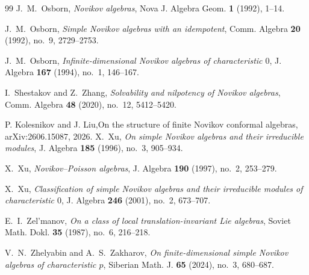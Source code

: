 \documentclass[11pt,reqno]{amsart}
\theoremstyle{plain}
\theoremstyle{definition}
\begin{document}
\begin{thebibliography}{99}
J.~M.~Osborn,
\emph{Novikov algebras},
Nova J. Algebra Geom. \textbf{1} (1992), 1--14.

J.~M.~Osborn,
\emph{Simple Novikov algebras with an idempotent},
Comm. Algebra \textbf{20} (1992), no.~9, 2729--2753.

J.~M.~Osborn,
\emph{Infinite-dimensional Novikov algebras of characteristic $0$},
J. Algebra \textbf{167} (1994), no.~1, 146--167.

I.~Shestakov and Z.~Zhang,
\emph{Solvability and nilpotency of Novikov algebras},
Comm. Algebra \textbf{48} (2020), no.~12, 5412--5420.

P. Kolesnikov and  J. Liu,On the structure of finite Novikov conformal algebras, 	arXiv:2606.15087, 2026.
X.~Xu,
\emph{On simple Novikov algebras and their irreducible modules},
J. Algebra \textbf{185} (1996), no.~3, 905--934.

X.~Xu,
\emph{Novikov--Poisson algebras},
J. Algebra \textbf{190} (1997), no.~2, 253--279.

X.~Xu,
\emph{Classification of simple Novikov algebras and their irreducible modules of
characteristic $0$},
J. Algebra \textbf{246} (2001), no.~2, 673--707.

E.~I.~Zel'manov,
\emph{On a class of local translation-invariant Lie algebras},
Soviet Math. Dokl. \textbf{35} (1987), no.~6, 216--218.

V.~N.~Zhelyabin and A.~S.~Zakharov,
\emph{On finite-dimensional simple Novikov algebras of characteristic $p$},
Siberian Math. J. \textbf{65} (2024), no.~3, 680--687.

\end{thebibliography}
\end{document}
